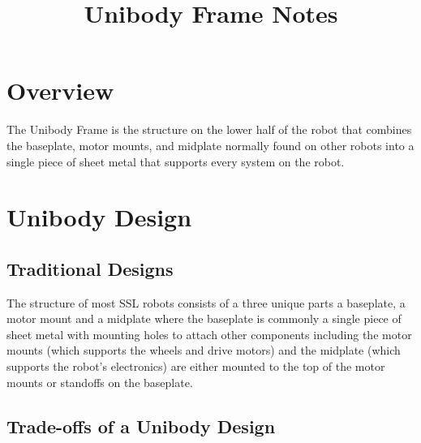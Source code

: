 \documentclass{iopart}
\begin{document}
\title{Unibody Frame Notes}

\section{Overview}
The Unibody Frame is the structure on the lower half of the robot that combines the baseplate, motor mounts, and midplate normally found on other robots into a single piece of sheet metal that supports every system on the robot.

\section{Unibody Design}
\subsection{Traditional Designs}
The structure of most SSL robots consists of a three unique parts a baseplate, a motor mount and a midplate where the baseplate is commonly a single piece of sheet metal with mounting holes to attach other components including the motor mounts (which supports the wheels and drive motors) and the midplate (which supports the robot's electronics) are either mounted to the top of the motor mounts or standoffs on the baseplate.


\subsection{Trade-offs of a Unibody Design}
\end{document}
